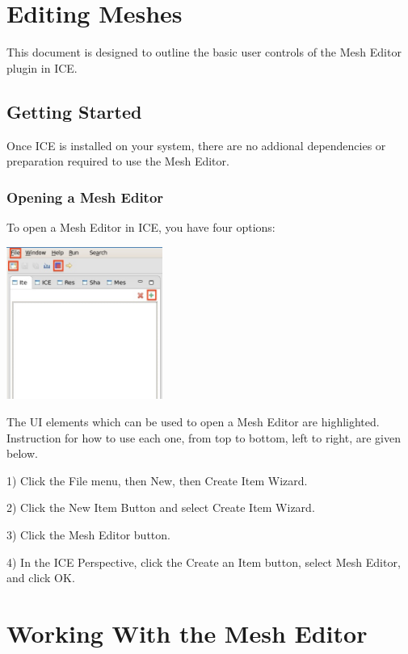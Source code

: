\documentclass{article}
\begin{document}
\section{Editing Meshes}

This document is designed to outline the basic user controls of the Mesh Editor plugin in ICE.

\subsection{Getting Started}

Once ICE is installed on your system, there are no addional dependencies or
preparation required to use the Mesh Editor.

\subsubsection{Opening a Mesh Editor}

To open a Mesh Editor in ICE, you have four options:
 

\begin{center}
\includegraphics[height=5cm]{images/CreateNewMeshOptions.jpg}
\end{center}

The UI elements which can be used to open a Mesh Editor are
highlighted. Instruction for how to use each one, from top to bottom, left to
right, are given below.

 
1) Click the File menu, then New, then Create Item Wizard.

 
2) Click the New Item Button and select Create Item Wizard.


3) Click the Mesh Editor button.


4) In the ICE Perspective, click the Create an Item button, select Mesh Editor,
and click OK.

\section{Working With the Mesh Editor}
\end{document}
